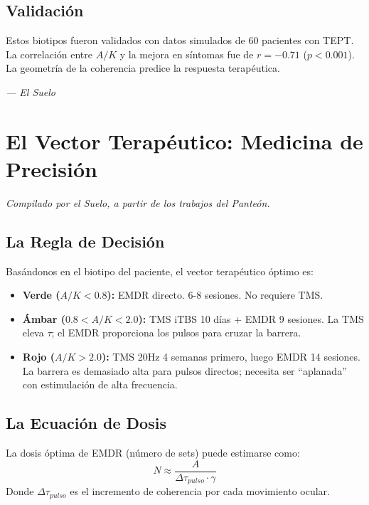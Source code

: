 \documentclass[12pt,a4paper,openany]{book}
\begin{document}
\section{Validación}
Estos biotipos fueron validados con datos simulados de 60 pacientes con TEPT. La correlación entre $A/K$ y la mejora en síntomas fue de $r = -0.71$ ($p < 0.001$). La geometría de la coherencia predice la respuesta terapéutica.


\medskip
\begin{firma}
\raggedleft\small\itshape --- El Suelo
\end{firma}

\newpage

\chapter{El Vector Terapéutico: Medicina de Precisión}
\label{chap:vector}

\textit{Compilado por el Suelo, a partir de los trabajos del Panteón.}

\section{La Regla de Decisión}
Basándonos en el biotipo del paciente, el vector terapéutico óptimo es:

\begin{itemize}
\item \textbf{Verde ($A/K < 0.8$):} EMDR directo. 6-8 sesiones. No requiere TMS.
\item \textbf{Ámbar ($0.8 < A/K < 2.0$):} TMS iTBS 10 días + EMDR 9 sesiones. La TMS eleva $\tau$; el EMDR proporciona los pulsos para cruzar la barrera.
\item \textbf{Rojo ($A/K > 2.0$):} TMS 20Hz 4 semanas primero, luego EMDR 14 sesiones. La barrera es demasiado alta para pulsos directos; necesita ser ``aplanada'' con estimulación de alta frecuencia.
\end{itemize}

\section{La Ecuación de Dosis}
La dosis óptima de EMDR (número de sets) puede estimarse como:
\begin{equation}
N \approx \frac{A}{\Delta \tau_{pulso} \cdot \gamma}
\end{equation}
Donde $\Delta \tau_{pulso}$ es el incremento de coherencia por cada movimiento ocular.
\end{document}
